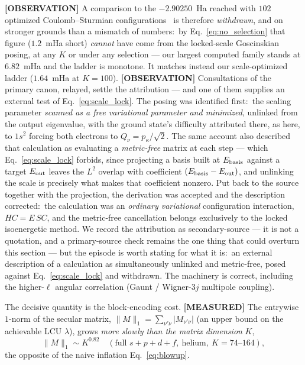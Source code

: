 \documentclass[aps,pra,twocolumn,superscriptaddress,longbibliography]{revtex4-2}
\newcommand{\gvq}[2]{#2}
\begin{document}
\textbf{[OBSERVATION]} A comparison to the $-2.90250$~Ha reached with $102$
optimized Coulomb--Sturmian configurations~\cite{avery2006} is therefore
\emph{withdrawn}, and on stronger grounds than a mismatch of numbers:\ by
Eq.~\eqref{eq:no_selection} that figure ($1.2$~mHa short) \emph{cannot} have come
from the locked-scale Goscinskian posing, at any $K$ or under any selection ---
our largest computed family stands at $6.82$~mHa and the ladder is monotone.  It
matches instead our scale-optimized ladder ($1.64$~mHa at $K=100$).
\textbf{[OBSERVATION]} Consultations of the primary canon, relayed,
settle the attribution --- and one of them supplies an external test of
Eq.~\eqref{eq:scale_lock}.  The posing was identified first:\ the scaling
parameter \emph{scanned as a free variational parameter and minimized}, unlinked
from the output eigenvalue, with the ground state's difficulty attributed there,
as here, to $1s^{2}$ forcing both electrons to $Q_\nu=p_\kappa/\sqrt2$.  The same
account also described that calculation as evaluating a \emph{metric-free} matrix
at each step --- which Eq.~\eqref{eq:scale_lock} forbids, since projecting a basis
built at $E_{\rm basis}$ against a target $E_{\rm out}$ leaves the $L^{2}$ overlap
with coefficient $(E_{\rm basis}-E_{\rm out})$, and unlinking the scale is
precisely what makes that coefficient nonzero.  Put back to the source together
with the projection, the derivation was accepted and the description corrected:\
the calculation was an \emph{ordinary variational} configuration interaction,
$HC=E\,SC$, and the metric-free cancellation belongs exclusively to the locked
isoenergetic method.  We record the attribution as secondary-source --- it is not
a quotation, and a primary-source check remains the one thing that could overturn
this section --- but the episode is worth stating for what it is:\ an external
description of a calculation as simultaneously unlinked and metric-free, posed
against Eq.~\eqref{eq:scale_lock} and withdrawn.  The machinery is correct, including the higher-$\ell$ angular
correlation (Gaunt / Wigner-$3j$ multipole coupling).

The decisive quantity is the block-encoding cost.  \textbf{[MEASURED]} The
entrywise $1$-norm of the secular matrix, $\|M\|_1=\sum_{\nu'\nu}|M_{\nu'\nu}|$
(an upper bound on the achievable LCU $\lambda$), grows \emph{more slowly than
the matrix dimension} $K$,
\begin{equation}
\|M\|_1\sim K^{\gvq{p60_onenorm_exponent}{0.82}}\quad
(\text{full }s\!+\!p\!+\!d\!+\!f,\ \text{helium},\ K=74\text{--}164),
\label{eq:sublinear}
\end{equation}
the opposite of the naive inflation Eq.~\eqref{eq:blowup}.
\end{document}
